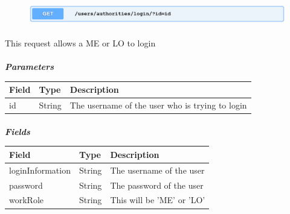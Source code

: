 						\clearpage
						\begin{figure}[!h]
							\includegraphics[width=\textwidth]{images/Restful/AuthorityLogin}
						\end{figure}
						\paragraph{}
						\vspace{-7.5mm}
						This request allows a ME or LO to login
						\paragraph{}
							\textcolor{myBlue}{\textit{\textbf{Parameters}}}
							\vspace{-2mm}
							\begin{table}[!h]
								\begin{tabular}{L{0.2\textwidth}L{0.2\textwidth}L{0.48\textwidth}}
									\toprule
									\textbf{Field} & \textbf{Type} & \textbf{Description} \\
									\midrule
								 	id & String & The username of the user who is trying to login \\
								 	\bottomrule
								\end{tabular}
							\end{table}
						\paragraph{}
							\vspace{-5mm}
							\textcolor{myBlue}{\textit{\textbf{Fields}}}
							\vspace{-2mm}
							\begin{table}[!h]
								\begin{tabular}{L{0.25\textwidth}L{0.15\textwidth}L{0.48\textwidth}}
									\toprule
									\textbf{Field} & \textbf{Type} & \textbf{Description} \\
									\midrule
								 	loginInformation & String  & The username of the user \\
								 	password & String & The password of the user \\
								 	workRole & String & This will be 'ME' or 'LO' \\
								 	\bottomrule
								\end{tabular}
							\end{table}
